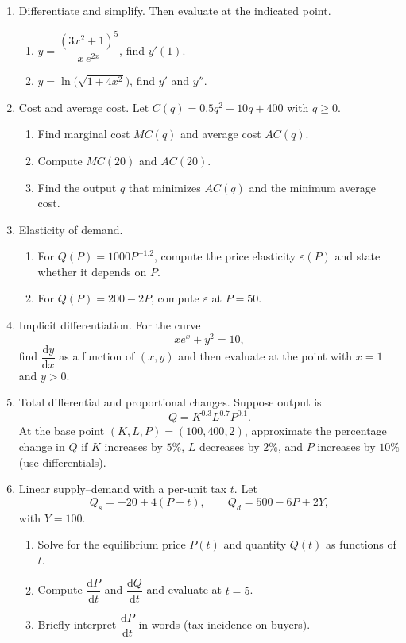 \documentclass[12pt]{article}
\begin{document}
\begin{enumerate}[resume]
\item Differentiate and simplify. Then evaluate at the indicated point.
\begin{enumerate}[label=(\alph*)]
  \item $y=\dfrac{(3x^2+1)^5}{x\,e^{2x}}$, find $y'(1)$.
  \item $y=\ln\!\big(\sqrt{1+4x^2}\big)$, find $y'$ and $y''$.
\end{enumerate}

\item Cost and average cost. Let $C(q)=0.5q^2+10q+400$ with $q\ge 0$.
\begin{enumerate}[label=(\alph*)]
  \item Find marginal cost $MC(q)$ and average cost $AC(q)$.
  \item Compute $MC(20)$ and $AC(20)$.
  \item Find the output $\hat q$ that minimizes $AC(q)$ and the minimum average cost.
\end{enumerate}

\item Elasticity of demand.
\begin{enumerate}[label=(\alph*)]
  \item For $Q(P)=1000P^{-1.2}$, compute the price elasticity $\varepsilon(P)$ and state whether it depends on $P$.
  \item For $Q(P)=200-2P$, compute $\varepsilon$ at $P=50$.
\end{enumerate}

\item Implicit differentiation. For the curve
\[
x e^{x}+y^2=10,
\]
find $\dfrac{\mathrm{d}y}{\mathrm{d}x}$ as a function of $(x,y)$ and then evaluate at the point with $x=1$ and $y>0$.

\item Total differential and proportional changes. Suppose output is
\[
Q=K^{0.3}L^{0.7}P^{0.1}.
\]
At the base point $(K,L,P)=(100,400,2)$, approximate the percentage change in $Q$ if $K$ increases by $5\%$, $L$ decreases by $2\%$, and $P$ increases by $10\%$ (use differentials).

\item Linear supply--demand with a per-unit tax $t$. Let
\[
Q_s=-20+4(P-t),\qquad Q_d=500-6P+2Y,
\]
with $Y=100$.
\begin{enumerate}[label=(\alph*)]
  \item Solve for the equilibrium price $P(t)$ and quantity $Q(t)$ as functions of $t$.
  \item Compute $\dfrac{\mathrm{d}P}{\mathrm{d}t}$ and $\dfrac{\mathrm{d}Q}{\mathrm{d}t}$ and evaluate at $t=5$.
  \item Briefly interpret $\dfrac{\mathrm{d}P}{\mathrm{d}t}$ in words (tax incidence on buyers).
\end{enumerate}


\end{enumerate}
\end{document}
